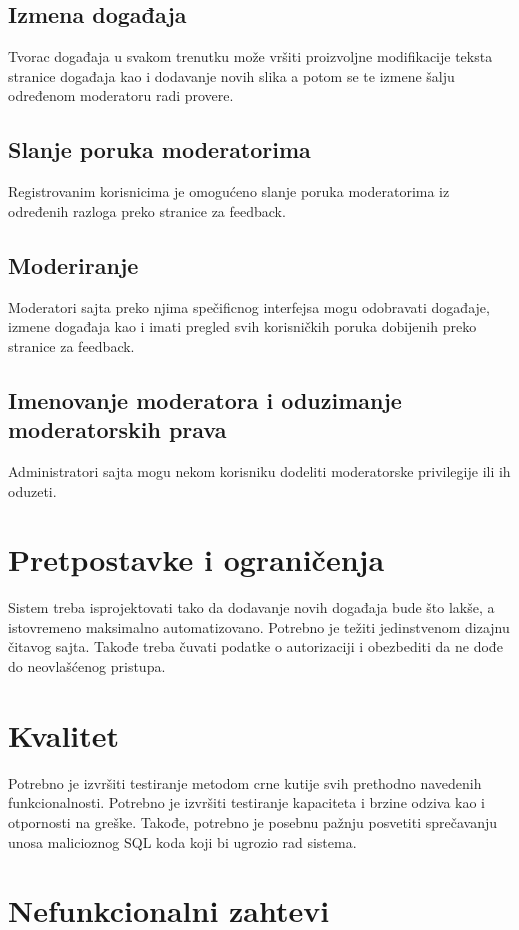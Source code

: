 \documentclass[11pt,a4paper]{article}
\begin{document}
\subsection{Izmena događaja}
Tvorac događaja u svakom trenutku može vršiti proizvoljne modifikacije teksta stranice događaja kao i dodavanje novih slika a potom se te izmene šalju određenom moderatoru radi provere.
\subsection{Slanje poruka moderatorima}
Registrovanim korisnicima je omogućeno slanje poruka moderatorima iz određenih razloga preko stranice za feedback.
\subsection{Moderiranje}
Moderatori sajta preko njima spečificnog interfejsa mogu odobravati događaje, izmene događaja kao i imati pregled svih korisničkih poruka dobijenih preko stranice za feedback.
\subsection{Imenovanje moderatora i oduzimanje moderatorskih prava}
Administratori sajta mogu nekom korisniku dodeliti moderatorske privilegije ili ih oduzeti.

\section{Pretpostavke i ograničenja}
Sistem treba isprojektovati tako da dodavanje novih događaja bude što lakše, a istovremeno maksimalno automatizovano. Potrebno je težiti jedinstvenom dizajnu čitavog sajta. Takođe treba čuvati podatke o autorizaciji i obezbediti da ne dođe do neovlašćenog pristupa.

\section{Kvalitet}
Potrebno je izvršiti testiranje metodom crne kutije svih prethodno navedenih funkcionalnosti. Potrebno je izvršiti testiranje kapaciteta i brzine odziva kao i otpornosti na greške. Takođe, potrebno je posebnu pažnju posvetiti sprečavanju unosa malicioznog SQL koda koji bi ugrozio rad sistema.

\section{Nefunkcionalni zahtevi}
\end{document}
